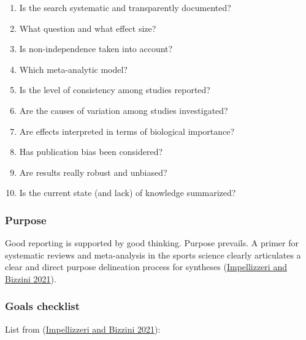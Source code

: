 \documentclass[
]{book}
\providecommand{\tightlist}{%
  \setlength{\itemsep}{0pt}\setlength{\parskip}{0pt}}
\begin{document}
\begin{enumerate}
\def\labelenumi{\arabic{enumi}.}
\tightlist
\item
  Is the search systematic and transparently documented?
\item
  What question and what effect size?\\
\item
  Is non-independence taken into account?\\
\item
  Which meta-analytic model?\\
\item
  Is the level of consistency among studies reported?\\
\item
  Are the causes of variation among studies investigated?\\
\item
  Are effects interpreted in terms of biological importance?\\
\item
  Has publication bias been considered?\\
\item
  Are results really robust and unbiased?\\
\item
  Is the current state (and lack) of knowledge summarized?
\end{enumerate}

\hypertarget{purpose}{%
\subsubsection*{Purpose}\label{purpose}}

Good reporting is supported by good thinking. Purpose prevails. A primer for systematic reviews and meta-analysis in the sports science clearly articulates a clear and direct purpose delineation process for syntheses (\href{https://www.ncbi.nlm.nih.gov/pmc/articles/PMC3474302/}{Impellizzeri and Bizzini 2021}).

\hypertarget{goals-checklist}{%
\subsubsection*{Goals checklist}\label{goals-checklist}}

List from (\href{https://www.ncbi.nlm.nih.gov/pmc/articles/PMC3474302/}{Impellizzeri and Bizzini 2021}):
\end{document}
